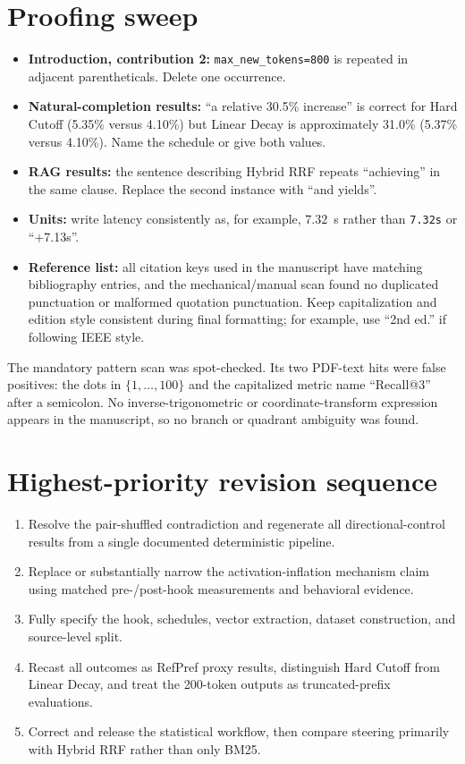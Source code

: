 \documentclass[11pt]{article}
\begin{document}
\section*{Proofing sweep}

\begin{itemize}
 \item \textbf{Introduction, contribution 2:} \texttt{max\_new\_tokens=800} is repeated in adjacent parentheticals.  Delete one occurrence.
 \item \textbf{Natural-completion results:} ``a relative 30.5\% increase'' is correct for Hard Cutoff (5.35\% versus 4.10\%) but Linear Decay is approximately 31.0\% (5.37\% versus 4.10\%).  Name the schedule or give both values.
 \item \textbf{RAG results:} the sentence describing Hybrid RRF repeats ``achieving'' in the same clause.  Replace the second instance with ``and yields''.
 \item \textbf{Units:} write latency consistently as, for example, $7.32$~s rather than \texttt{7.32s} or ``+7.13s''.
 \item \textbf{Reference list:} all citation keys used in the manuscript have matching bibliography entries, and the mechanical/manual scan found no duplicated punctuation or malformed quotation punctuation.  Keep capitalization and edition style consistent during final formatting; for example, use ``2nd ed.'' if following IEEE style.
\end{itemize}

The mandatory pattern scan was spot-checked.  Its two PDF-text hits were false positives: the dots in $\{1,\ldots,100\}$ and the capitalized metric name ``Recall@3'' after a semicolon.  No inverse-trigonometric or coordinate-transform expression appears in the manuscript, so no branch or quadrant ambiguity was found.

\section*{Highest-priority revision sequence}

\begin{enumerate}
 \item Resolve the pair-shuffled contradiction and regenerate all directional-control results from a single documented deterministic pipeline.
 \item Replace or substantially narrow the activation-inflation mechanism claim using matched pre-/post-hook measurements and behavioral evidence.
 \item Fully specify the hook, schedules, vector extraction, dataset construction, and source-level split.
 \item Recast all outcomes as RefPref proxy results, distinguish Hard Cutoff from Linear Decay, and treat the 200-token outputs as truncated-prefix evaluations.
 \item Correct and release the statistical workflow, then compare steering primarily with Hybrid RRF rather than only BM25.
\end{enumerate}
\end{document}
